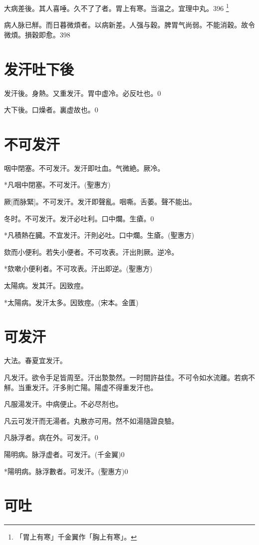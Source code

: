 \documentclass[12pt,oneside,UTF8,b5paper]{ctexbook}她她她她她她她
\begin{document}
大病差後。其人喜唾。久不了了者。胃上有寒。当温之。宜理中丸。396
	\footnote{「胃上有寒」千金翼作「胸上有寒」。}

病人脉已觧。而日暮微煩者。以病新差。人强与穀。脾胃气尚弱。不能消穀。故令微煩。損穀即愈。398

\chapter{发汗吐下後}

发汗後。身熱。又重发汗。胃中虚冷。必反吐也。0

大下後。口燥者。裏虚故也。0

\chapter{不可发汗}

咽中閉塞。不可发汗。发汗即吐血。气微絶。厥冷。

*凡咽中閉塞。不可发汗。(聖惠方)

厥[而脉緊]。不可发汗。发汗即聲亂。咽嘶。舌萎。聲不能出。

冬时。不可发汗。发汗必吐利。口中爛。生瘡。0

*凡積熱在臓。不宜发汗。汗則必吐。口中爛。生瘡。(聖惠方)

欬而小便利。若失小便者。不可攻表。汗出則厥。逆冷。

*欬嗽小便利者。不可攻表。汗出即逆。(聖惠方)

太陽病。发其汗。因致痙。

*太陽病。发汗太多。因致痙。(宋本。金匱)

\chapter{可发汗}

大法。春夏宜发汗。

凡发汗。欲令手足皆周至。汗出漐漐然。一时間許益佳。不可令如水流離。若病不觧。当重发汗。汗多則亡陽。陽虚不得重发汗也。

凡服湯发汗。中病便止。不必尽剂也。

凡云可发汗而无湯者。丸散亦可用。然不如湯隨證良驗。

凡脉浮者。病在外。可发汗。0

陽明病。脉浮虚者。可发汗。(千金翼)0

*陽明病。脉浮數者。可发汗。(聖惠方)0

\chapter{可吐}
\end{document}
